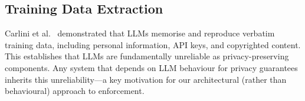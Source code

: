 \subsection{Training Data Extraction}

Carlini et al.~\cite{carlini2021extracting} demonstrated that LLMs memorise and reproduce verbatim training data, including personal information, API keys, and copyrighted content. This establishes that LLMs are fundamentally unreliable as privacy-preserving components. Any system that depends on LLM behaviour for privacy guarantees inherits this unreliability---a key motivation for our architectural (rather than behavioural) approach to enforcement.
